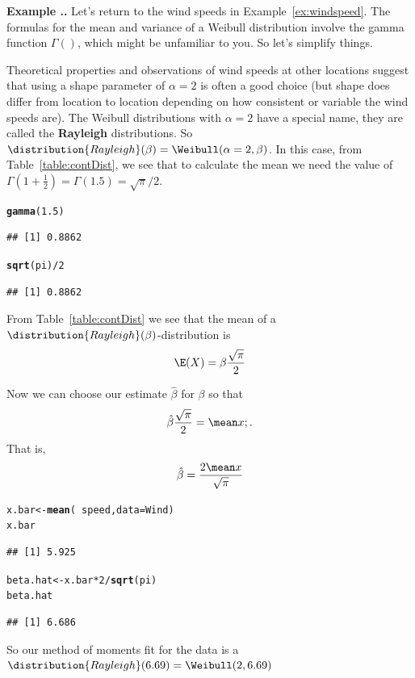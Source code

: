 \documentclass[twoside]{book}\usepackage[]{graphicx}\usepackage[]{xcolor}
\makeatletter
\newcommand{\hlnum}[1]{\textcolor[rgb]{0.686,0.059,0.569}{#1}}%
\newcommand{\hlopt}[1]{\textcolor[rgb]{0,0,0}{#1}}%
\newcommand{\hlstd}[1]{\textcolor[rgb]{0.345,0.345,0.345}{#1}}%
\newcommand{\hlkwb}[1]{\textcolor[rgb]{0.69,0.353,0.396}{#1}}%
\newcommand{\hlkwc}[1]{\textcolor[rgb]{0.333,0.667,0.333}{#1}}%
\newcommand{\hlkwd}[1]{\textcolor[rgb]{0.737,0.353,0.396}{\textbf{#1}}}%
\newenvironment{kframe}{%
 \def\at@end@of@kframe{}%
 \ifinner\ifhmode%
  \def\at@end@of@kframe{\end{minipage}}%
  \begin{minipage}{\columnwidth}%
 \fi\fi%
 \def\FrameCommand##1{\hskip\@totalleftmargin \hskip-\fboxsep
 \colorbox{shadecolor}{##1}\hskip-\fboxsep
     \hskip-\linewidth \hskip-\@totalleftmargin \hskip\columnwidth}%
 \MakeFramed {\advance\hsize-\width
   \@totalleftmargin\z@ \linewidth\hsize
   \@setminipage}}%
 {\par\unskip\endMakeFramed%
 \at@end@of@kframe}
\newenvironment{knitrout}{}{} %
\def\Rayleigh{\distribution{Rayleigh}}
\def\term#1{\textbf{#1}}
\newcounter{example}[section]
\newenvironment{example}%
{\refstepcounter{example}%
\textbf{Example \thesection.\arabic{example}. }}%
{}
\makeatother
\begin{document}
\begin{example}
	Let's return to the wind speeds in Example~\ref{ex:windspeed}.
	The formulas for the mean and variance of a Weibull distribution involve
	the gamma function $\Gamma()$, which might be unfamiliar to you.  So let's 
	simplify things.

	Theoretical properties and observations of wind speeds at other locations 
	suggest that using a shape parameter of $\alpha = 2$ is often a good choice (but 
	shape does differ from location to location depending on how consistent or 
	variable the wind speeds are).
	The Weibull distributions with $\alpha = 2$ have a special name, they are 
	called the \term{Rayleigh} distributions.  
	So $\Rayleigh(\beta) = \Weibull(\alpha = 2, \beta)$.
	In this case, from Table~\ref{table:contDist}, we see that to calculate 
	the mean we need the value of $\Gamma(1 + \frac{1}{2}) = \Gamma(1.5) = \sqrt{\pi}/2$.
\begin{knitrout}
\color{fgcolor}\begin{kframe}
\begin{alltt}
\hlkwd{gamma}\hlstd{(}\hlnum{1.5}\hlstd{)}
\end{alltt}
\begin{verbatim}
## [1] 0.8862
\end{verbatim}
\begin{alltt}
\hlkwd{sqrt}\hlstd{(pi)}\hlopt{/}\hlnum{2}
\end{alltt}
\begin{verbatim}
## [1] 0.8862
\end{verbatim}
\end{kframe}
\end{knitrout}
	From Table~\ref{table:contDist} we see that the mean of a 
	$\Rayleigh(\beta)$-distribution is 
	\[
	\E(X) = \beta \frac{\sqrt{\pi}}{2}
	\]

	Now we can choose our estimate $\hat \beta$ for $\beta$ so that 
	\[
	\hat \beta \frac{\sqrt{\pi}}{2} = \mean x  ;.
	\]
	That is,
	\[
	\hat\beta = \frac{2 \mean x }{\sqrt{\pi}}
	\]
\begin{knitrout}
\color{fgcolor}\begin{kframe}
\begin{alltt}
\hlstd{x.bar} \hlkwb{<-} \hlkwd{mean}\hlstd{(}\hlopt{~}\hlstd{speed,} \hlkwc{data} \hlstd{= Wind)}
\hlstd{x.bar}
\end{alltt}
\begin{verbatim}
## [1] 5.925
\end{verbatim}
\begin{alltt}
\hlstd{beta.hat} \hlkwb{<-} \hlstd{x.bar} \hlopt{*} \hlnum{2} \hlopt{/} \hlkwd{sqrt}\hlstd{(pi)}
\hlstd{beta.hat}
\end{alltt}
\begin{verbatim}
## [1] 6.686
\end{verbatim}
\end{kframe}
\end{knitrout}
So our method of moments fit for the data is a 
$\Rayleigh(6.69) = \Weibull(2, 6.69)$


\end{example}
\end{document}
